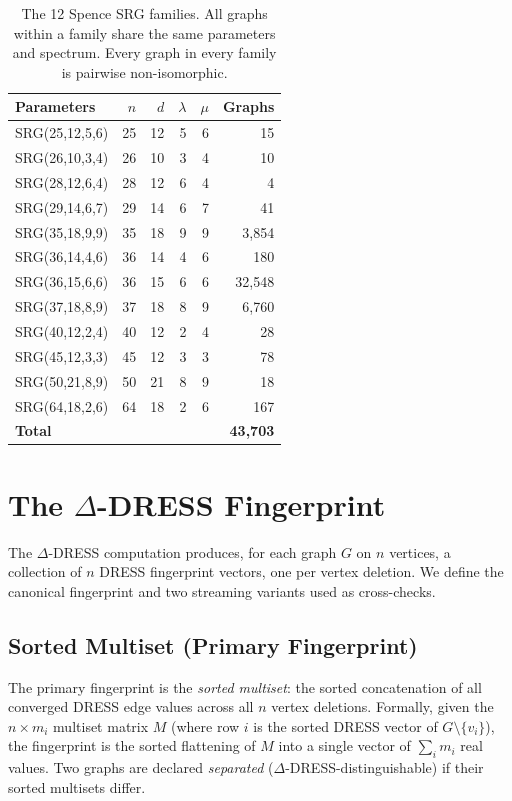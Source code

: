 \documentclass[11pt,a4paper]{article}
\begin{document}
\begin{table}[t]
\centering
\caption{The 12 Spence SRG families. All graphs within a family share the same parameters and spectrum. Every graph in every family is pairwise non-isomorphic.}
\label{tab:spence-families}
\begin{tabular}{@{}lrrrrr@{}}
\toprule
Parameters & $n$ & $d$ & $\lambda$ & $\mu$ & Graphs \\
\midrule
SRG(25,12,5,6) & 25 & 12 & 5 & 6 & 15 \\
SRG(26,10,3,4) & 26 & 10 & 3 & 4 & 10 \\
SRG(28,12,6,4) & 28 & 12 & 6 & 4 & 4 \\
SRG(29,14,6,7) & 29 & 14 & 6 & 7 & 41 \\
SRG(35,18,9,9) & 35 & 18 & 9 & 9 & 3{,}854 \\
SRG(36,14,4,6) & 36 & 14 & 4 & 6 & 180 \\
SRG(36,15,6,6) & 36 & 15 & 6 & 6 & 32{,}548 \\
SRG(37,18,8,9) & 37 & 18 & 8 & 9 & 6{,}760 \\
SRG(40,12,2,4) & 40 & 12 & 2 & 4 & 28 \\
SRG(45,12,3,3) & 45 & 12 & 3 & 3 & 78 \\
SRG(50,21,8,9) & 50 & 21 & 8 & 9 & 18 \\
SRG(64,18,2,6) & 64 & 18 & 2 & 6 & 167 \\
\midrule
\textbf{Total} & & & & & \textbf{43{,}703} \\
\bottomrule
\end{tabular}
\end{table}


\section{The \texorpdfstring{$\Delta$}{Delta}-DRESS Fingerprint}
\label{sec:fingerprint}

The $\Delta$-DRESS computation produces, for each graph $G$ on $n$ vertices, a collection of $n$ DRESS fingerprint vectors, one per vertex deletion.
We define the canonical fingerprint and two streaming variants used as cross-checks.


\subsection{Sorted Multiset (Primary Fingerprint)}

The primary fingerprint is the \emph{sorted multiset}: the sorted concatenation of all converged DRESS edge values across all $n$ vertex deletions.
Formally, given the $n \times m_i$ multiset matrix $M$ (where row $i$ is the sorted DRESS vector of $G \setminus \{v_i\}$), the fingerprint is the sorted flattening of $M$ into a single vector of $\sum_i m_i$ real values.
Two graphs are declared \emph{separated} ($\Delta$-DRESS-distinguishable) if their sorted multisets differ.
\end{document}
